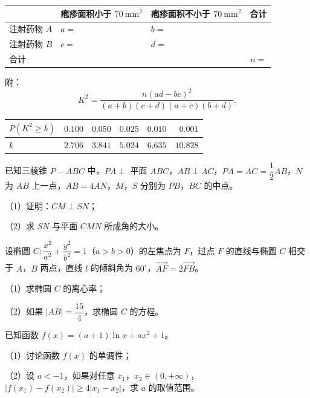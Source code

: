 \begin{question}
\begin{center}
\begin{tabular}{lllr}
\toprule
 & 疱疹面积小于 $70\ \mathrm{mm}^2$ & 疱疹面积不小于 $70\ \mathrm{mm}^2$ & 合计 \\
\midrule
注射药物 $A$ & $a=$ & $b=$ &  \\
注射药物 $B$ & $c=$ & $d=$ &  \\
合计 &  &  & $n=$ \\
\bottomrule
\end{tabular}
\end{center}

附：
\nopagebreak[4]
\[K^2=\frac{n(ad-bc)^2}{(a+b)(c+d)(a+c)(b+d)}.\]

\begin{center}
\begin{tabular}{lrrrrr}
\toprule
$P(K^2\geqslant k)$ & $0.100$ & $0.050$ & $0.025$ & $0.010$ & $0.001$ \\
\midrule
$k$ & $2.706$ & $3.841$ & $5.024$ & $6.635$ & $10.828$ \\
\bottomrule
\end{tabular}
\end{center}

\Needspace{0.4\textheight}
\end{question}
\endgroup
\begingroup
\renewenvironment{question}{\Needspace{0.5\textheight}}{}
\begin{question}
已知三棱锥 $P-ABC$ 中，$PA\perp$ 平面 $ABC$，$AB\perp AC$，$PA=AC=\dfrac12AB$，$N$ 为 $AB$ 上一点，$AB=4AN$，$M$，$S$ 分别为 $PB$，$BC$ 的中点。

（1）证明：$CM\perp SN$；

（2）求 $SN$ 与平面 $CMN$ 所成角的大小。
\nopagebreak[4]
\begin{center}\end{center}
\nopagebreak[4]
\end{question}
\endgroup
\begin{question}
设椭圆 $C:\dfrac{x^2}{a^2}+\dfrac{y^2}{b^2}=1$（$a>b>0$）的左焦点为 $F$，过点 $F$ 的直线与椭圆 $C$ 相交于 $A$，$B$ 两点，直线 $l$ 的倾斜角为 $60^\circ$，$\overrightarrow{AF}=2\overrightarrow{FB}$。

（1）求椭圆 $C$ 的离心率；

（2）如果 $|AB|=\dfrac{15}{4}$，求椭圆 $C$ 的方程。

\end{question}
\begin{question}
已知函数 $f(x)=(a+1)\ln x+ax^2+1$。

（1）讨论函数 $f(x)$ 的单调性；

（2）设 $a<-1$，如果对任意 $x_1$，$x_2\in(0,+\infty)$，$|f(x_1)-f(x_2)|\geqslant4|x_1-x_2|$，求 $a$ 的取值范围。

\Needspace{0.4\textheight}
\end{question}
